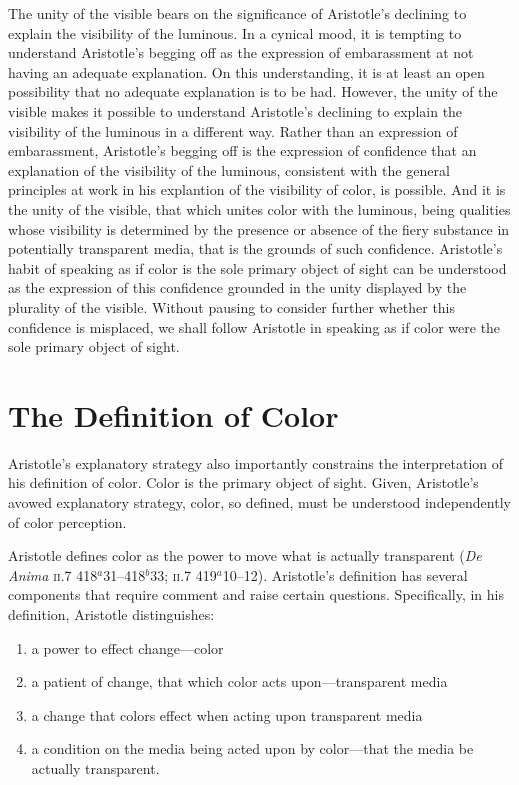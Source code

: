 The unity of the visible bears on the significance of Aristotle's declining to explain the visibility of the luminous. In a cynical mood, it is tempting to understand Aristotle's begging off as the expression of embarassment at not having an adequate explanation. On this understanding, it is at least an open possibility that no adequate explanation is to be had. However, the unity of the visible makes it possible to understand Aristotle's declining to explain the visibility of the luminous in a different way. Rather than an expression of embarassment, Aristotle's begging off is the expression of confidence that an explanation of the visibility of the luminous, consistent with the general principles at work in his explantion of the visibility of color, is possible. And it is the unity of the visible, that which unites color with the luminous, being qualities whose visibility is determined by the presence or absence of the fiery substance in potentially transparent media, that is the grounds of such confidence. Aristotle's habit of speaking as if color is the sole primary object of sight can be understood as the expression of this confidence grounded in the unity displayed by the plurality of the visible. Without pausing to consider further whether this confidence is misplaced, we shall follow Aristotle in speaking as if color were the sole primary object of sight.


\section{The Definition of Color} %
\label{sec:the_definition_of_color}

Aristotle's explanatory strategy also importantly constrains the interpretation of his definition of color. Color is the primary object of sight. Given, Aristotle's avowed explanatory strategy, color, so defined, must be understood independently of color perception.

Aristotle defines color as the power to move what is actually transparent (\emph{De Anima} \textsc{ii}.7 418\( ^{a} \)31--418\( ^{b} \)33; \textsc{ii}.7 419\( ^{a} \)10--12). Aristotle's definition has several components that require comment and raise certain questions. Specifically, in his definition, Aristotle distinguishes: 
\begin{enumerate}[(1)]
	\item a power to effect change---color
	\item a patient of change, that which color acts upon---transparent media
	\item a change that colors effect when acting upon transparent media
	\item  a condition on the media being acted upon by color---that the media be actually transparent.
\end{enumerate}

